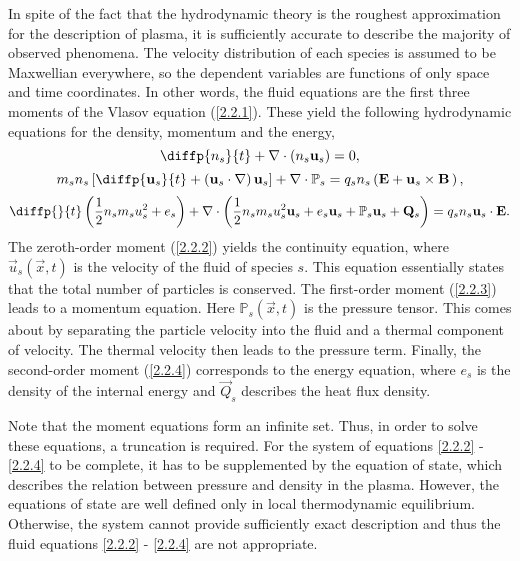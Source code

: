 In spite of the fact that the hydrodynamic theory is the roughest approximation for the description of plasma, it is sufficiently accurate to describe the majority of observed phenomena. The velocity distribution of each species is assumed to be Maxwellian everywhere, so the dependent variables are functions of only space and time coordinates. In other words, the fluid equations are the first three moments of the Vlasov equation (\ref{2.2.1}). These yield the following hydrodynamic equations for the density, momentum and the energy,
\begin{equation}
\label{2.2.2}
\diffp{n_s}{t} + \nabla \cdot \left(n_s \vec{u}_s \right) = 0,
\end{equation}
\begin{equation}
\label{2.2.3}
m_s n_s \left[ \diffp{\vec{u}_s}{t} + \left(\vec{u}_s \cdot \nabla \right) \vec{u}_s \right] + \nabla \cdot \mathbb{P}_s = q_s n_s \left(\vec{E} + \vec{u}_s \times \vec{B} \, \right),
\end{equation}
\begin{equation}
\label{2.2.4}
\diffp{}{t} \left(\frac{1}{2} n_s m_s u_s^2 + e_{s} \right) + \nabla \cdot \left(\frac{1}{2} n_s m_s u_s^2 \vec{u}_s + e_{s} \vec{u}_s + \mathbb{P}_s \vec{u}_s + \vec{Q}_s \right) = q_s n_s \vec{u}_s \cdot \vec{E}.
\end{equation}
The zeroth-order moment (\ref{2.2.2}) yields the continuity equation, where $ \vec{u}_s\left(\vec{x}, t \right) $ is the velocity of the fluid of species $ s $. This equation essentially states that the total number of particles is conserved. The first-order moment (\ref{2.2.3}) leads to a momentum equation. Here $ \mathbb{P}_s\left(\vec{x}, t \right) $ is the pressure tensor. This comes about by separating the particle velocity into the fluid and a thermal component of velocity. The thermal velocity then leads to the pressure term. Finally, the second-order moment (\ref{2.2.4}) corresponds to the energy equation, where $ e_{s} $ is the density of the internal energy and $ \vec{Q}_s $ describes the heat flux density.

Note that the moment equations form an infinite set. Thus, in order to solve these equations, a truncation is required. For the system of equations \ref{2.2.2} - \ref{2.2.4} to be complete, it has to be supplemented by the equation of state, which describes the relation between pressure and density in the plasma. However, the equations of state are well defined only in local thermodynamic equilibrium. Otherwise, the system cannot provide sufficiently exact description and thus the fluid equations \ref{2.2.2} - \ref{2.2.4} are not appropriate.